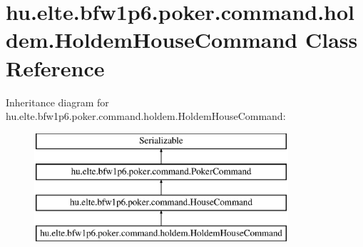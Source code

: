 \hypertarget{classhu_1_1elte_1_1bfw1p6_1_1poker_1_1command_1_1holdem_1_1_holdem_house_command}{}\section{hu.\+elte.\+bfw1p6.\+poker.\+command.\+holdem.\+Holdem\+House\+Command Class Reference}
\label{classhu_1_1elte_1_1bfw1p6_1_1poker_1_1command_1_1holdem_1_1_holdem_house_command}
Inheritance diagram for hu.\+elte.\+bfw1p6.\+poker.\+command.\+holdem.\+Holdem\+House\+Command\+:\begin{figure}[H]
\begin{center}
\leavevmode
\includegraphics[height=4.000000cm]{classhu_1_1elte_1_1bfw1p6_1_1poker_1_1command_1_1holdem_1_1_holdem_house_command}
\end{center}
\end{figure}

